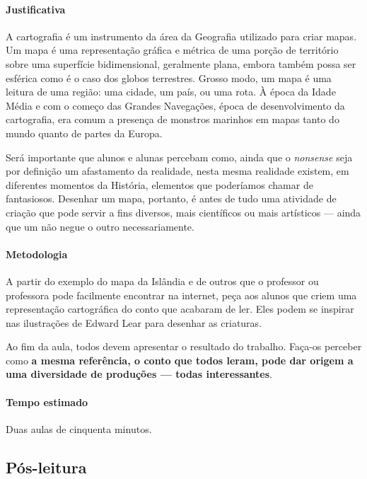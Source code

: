 \documentclass[11pt]{extarticle}
\begin{document}
\paragraph{Justificativa} A cartografia é um instrumento da área da Geografia utilizado para 
criar mapas. Um mapa é uma representação gráfica e métrica de uma porção de território sobre 
uma superfície bidimensional, geralmente plana, embora também possa ser esférica como é o caso 
dos globos terrestres. Grosso modo, um mapa é uma leitura de uma região: uma cidade, um país, 
ou uma rota. À época da Idade Média e com o começo das Grandes Navegações, época de desenvolvimento
da cartografia, era comum a presença de monstros marinhos em mapas tanto do mundo quanto de partes da Europa.


Será importante que alunos e alunas percebam como, ainda que o \emph{nonsense} seja
por definição um afastamento da realidade, nesta mesma realidade existem, em diferentes momentos
da História, elementos que poderíamos chamar de fantasiosos. Desenhar um mapa, portanto, 
é antes de tudo uma atividade de criação que pode servir a fins diversos, mais
científicos ou mais artísticos --- ainda que um não negue o outro necessariamente.

\paragraph{Metodologia} A partir do exemplo do mapa da Islândia e de outros que o professor
ou professora pode facilmente encontrar na internet, peça aos alunos que criem
uma representação cartográfica do conto que acabaram de ler. 
Eles podem se inspirar nas ilustrações de Edward Lear para desenhar as criaturas. 


Ao fim da aula, todos devem apresentar o resultado do trabalho.
Faça-os perceber como \textbf{a mesma referência, o conto que todos leram,
pode dar origem a uma diversidade de produções --- todas interessantes}.


\paragraph{Tempo estimado} Duas aulas de cinquenta minutos.


\subsection{Pós-leitura}
\end{document}
